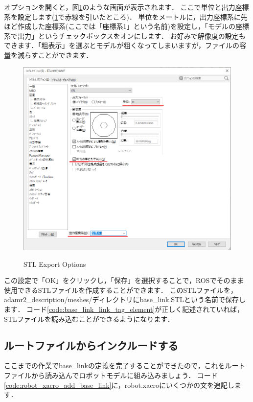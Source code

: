 \documentclass[{../../master}]{subfiles}
\begin{document}
\noindent
オプションを開くと，図\ref{fig:base_link_stl_export_options}のような画面が表示されます．
ここで単位と出力座標系を設定します(\ref{fig:base_link_stl_export_options}で赤線を引いたところ)．
単位をメートルに，出力座標系に先ほど作成した座標系(ここでは「座標系1」という名前)を設定し，「モデルの座標系で出力」というチェックボックスをオンにします．
お好みで解像度の設定もできます．「粗表示」を選ぶとモデルが粗くなってしまいますが，ファイルの容量を減らすことができます．

\begin{figure}[ht]
  \centering
  \includegraphics[width=100truemm, clip]{images/base_link_stl_export_options.png}
  \label{fig:base_link_stl_export_options}
  \caption{STL Export Options}
\end{figure}

この設定で「OK」をクリックし，「保存」を選択することで，ROSでそのまま使用できるSTLファイルを作成することができます．
このSTLファイルを，\textsf{adamr2\_description/meshes/}ディレクトリに\textsf{base\_link.STL}という名前で保存します．
コード\ref{code:base_link_link_tag_element}が正しく記述されていれば，STLファイルを読み込むことができるようになります．

\subsection{ルートファイルからインクルードする}
\label{sec:base_link_include}

ここまでの作業で\textsf{base\_link}の定義を完了することができたので，これをルートファイルから読み込んでロボットモデルに組み込みましょう．
コード\ref{code:robot_xacro_add_base_link}に，\textsf{robot.xacro}にいくつかの文を追記します．
\end{document}
